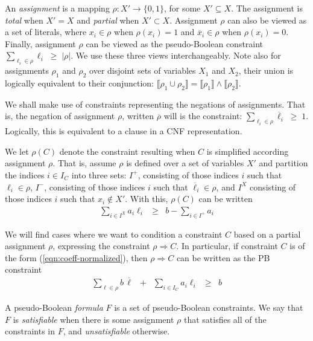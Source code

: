 \documentclass{easychair}
\renewcommand{\obar}[1]{\overline{#1}}
\newcommand{\lit}{\ell}
\newcommand{\assign}{\rho}
\newcommand{\nassign}{\obar{\assign}}
\newcommand{\indices}{I}
\newcommand{\imply}{\Rightarrow}
\newcommand{\func}[1]{\llbracket#1\rrbracket}
\begin{document}
An {\em assignment} is a mapping $\assign : X' \rightarrow \{0,1\}$,
for some $X' \subseteq X$.  The assignment is {\em total} when $X' =
X$ and {\em partial} when $X' \subset X$.  Assignment $\assign$ can
also be viewed as a set of literals, where $x_i \in \assign$ when
$\assign(x_i) = 1$ and $\obar{x}_i \in \assign$ when $\assign(x_i) = 0$.
Finally, assignment $\assign$ can be viewed as the
pseudo-Boolean constraint $\sum_{\lit_i \in \assign} \lit_i \;\geq\;| \assign |$.
We use these three views interchangeably.  Note also for
assignments $\assign_1$ and $\assign_2$ over disjoint sets of
variables $X_1$ and $X_2$, their union is logically equivalent to
their conjunction: $\func{\assign_1 \cup \assign_2} = \func{\assign_1}
\land \func{\assign_2}$.

We shall make use of constraints representing the negations of
assignments.  That is, the negation of assignment $\assign$, written
$\nassign$ will is the constraint:
$\sum_{\lit_i \in \assign} \obar{\lit}_i \;\geq\; 1$.
Logically, this is equivalent to a clause in a CNF
representation.



We let $\assign(C)$ denote the constraint resulting when $C$ is
simplified according assignment $\assign$.  That is, assume $\assign$ is defined over a set of variables $X'$ and
partition the indices $i \in \indices_C$ into
three sets:
$I^{+}$, consisting of those indices $i$ such that $\lit_{i} \in \assign$,
$I^{-}$, consisting of those indices $i$ such that $\obar{\lit}_{i} \in \assign$,
and $I^{X}$ consisting of those indices $i$ such that $x_i \not \in X'$.
With this, $\assign(C)$ can be written
\begin{eqnarray}
\sum_{i \in I^{X}} a_{i} \lit_{i} & \geq & b - \sum_{i \in I^{+}} a_{i} \label{eqn:assigned}
\end{eqnarray}

We will find cases where we want to condition a constraint $C$ based
on a partial assignment $\assign$, expressing the constraint $\assign
\imply C$.  In particular, if constraint $C$ is of the form
(\ref{eqn:coeff-normalized}), then $\assign \imply C$ can be written as the PB constraint
\begin{eqnarray}
\sum_{\lit \in \assign} b\, \obar{\lit} \;\; + \;\;  \sum_{i \in \indices_C} a_{i} \lit_{i} & \geq & b \label{eqn:implication}
\end{eqnarray}

A pseudo-Boolean {\em formula} $F$ is a set of pseudo-Boolean
constraints.  We say that $F$ is {\em satisfiable} when there is some
assignment $\assign$ that satisfies all of the constraints in $F$, and
{\em unsatisfiable} otherwise.  
\end{document}
